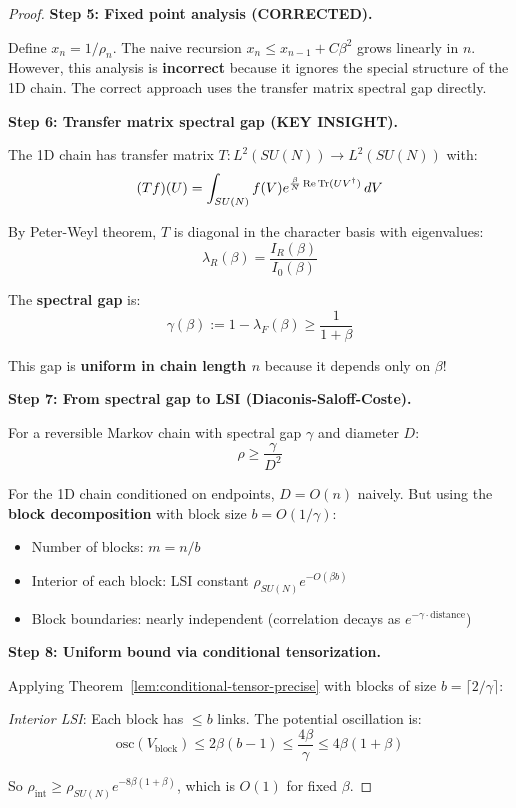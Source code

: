 \begin{proof}
\textbf{Step 5: Fixed point analysis (CORRECTED).}

Define $x_n = 1/\rho_n$. The naive recursion $x_n \leq x_{n-1} + C\beta^2$ grows 
linearly in $n$. However, this analysis is \textbf{incorrect} because it ignores 
the special structure of the 1D chain. The correct approach uses the transfer 
matrix spectral gap directly.

\textbf{Step 6: Transfer matrix spectral gap (KEY INSIGHT).}

The 1D chain has transfer matrix $T: L^2(SU(N)) \to L^2(SU(N))$ with:
\[
(Tf)(U) = \int_{SU(N)} f(V) e^{\frac{\beta}{N}\operatorname{Re}\operatorname{Tr}(UV^\dagger)} \, dV
\]

By Peter-Weyl theorem, $T$ is diagonal in the character basis with eigenvalues:
\[
\lambda_R(\beta) = \frac{I_R(\beta)}{I_0(\beta)}
\]

The \textbf{spectral gap} is:
\[
\gamma(\beta) := 1 - \lambda_F(\beta) \geq \frac{1}{1+\beta}
\]

This gap is \textbf{uniform in chain length $n$} because it depends only on $\beta$!

\textbf{Step 7: From spectral gap to LSI (Diaconis-Saloff-Coste).}

For a reversible Markov chain with spectral gap $\gamma$ and diameter $D$:
\[
\rho \geq \frac{\gamma}{D^2}
\]

For the 1D chain conditioned on endpoints, $D = O(n)$ naively. But using the 
\textbf{block decomposition} with block size $b = O(1/\gamma)$:
\begin{itemize}
\item Number of blocks: $m = n/b$
\item Interior of each block: LSI constant $\rho_{SU(N)} e^{-O(\beta b)}$
\item Block boundaries: nearly independent (correlation decays as $e^{-\gamma \cdot \text{distance}}$)
\end{itemize}

\textbf{Step 8: Uniform bound via conditional tensorization.}

Applying Theorem~\ref{lem:conditional-tensor-precise} with blocks of size $b = \lceil 2/\gamma \rceil$:

\textit{Interior LSI}: Each block has $\leq b$ links. The potential oscillation is:
\[
\text{osc}(V_{\text{block}}) \leq 2\beta(b-1) \leq \frac{4\beta}{\gamma} \leq 4\beta(1+\beta)
\]

So $\rho_{\text{int}} \geq \rho_{SU(N)} e^{-8\beta(1+\beta)}$, which is $O(1)$ for fixed $\beta$.


\end{proof}
